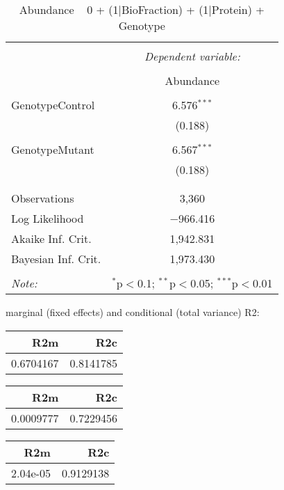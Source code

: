 \documentclass[11pt]{report}
\begin{document}
\begin{table}[!htbp] \centering 
  \caption{Abundance ~ 0 + (1|BioFraction) + (1|Protein) + Genotype} 
  \label{} 
\begin{tabular}{@{\extracolsep{5pt}}lc} 
\\[-1.8ex]\hline 
\hline \\[-1.8ex] 
 & \multicolumn{1}{c}{\textit{Dependent variable:}} \\ 
\cline{2-2} 
\\[-1.8ex] & Abundance \\ 
\hline \\[-1.8ex] 
 GenotypeControl & 6.576$^{***}$ \\ 
  & (0.188) \\ 
  & \\ 
 GenotypeMutant & 6.567$^{***}$ \\ 
  & (0.188) \\ 
  & \\ 
\hline \\[-1.8ex] 
Observations & 3,360 \\ 
Log Likelihood & $-$966.416 \\ 
Akaike Inf. Crit. & 1,942.831 \\ 
Bayesian Inf. Crit. & 1,973.430 \\ 
\hline 
\hline \\[-1.8ex] 
\textit{Note:}  & \multicolumn{1}{r}{$^{*}$p$<$0.1; $^{**}$p$<$0.05; $^{***}$p$<$0.01} \\ 
\end{tabular} 
\end{table} 
marginal (fixed effects) and conditional (total variance) R2:

\begin{tabular}{r|r}
\hline
R2m & R2c\\
\hline
0.6704167 & 0.8141785\\
\hline
\end{tabular}

\begin{tabular}{r|r}
\hline
R2m & R2c\\
\hline
0.0009777 & 0.7229456\\
\hline
\end{tabular}

\begin{tabular}{r|r}
\hline
R2m & R2c\\
\hline
2.04e-05 & 0.9129138\\
\hline
\end{tabular}
\end{document}

